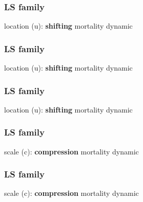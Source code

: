 \documentclass[12pt, xcolor=table]{beamer}  %
\begin{document}
\begin{frame}\frametitle{LS family}
	\begin{center}
		\vspace{0.15cm}
		\normalsize {\color{white}location (u): \textbf{shifting} mortality dynamic} \\
	\end{center}
	
\end{frame}

\begin{frame}[noframenumbering]\frametitle{LS family}
	\begin{center}
		\vspace{0.15cm}
		\normalsize {\color{red}location (u)}: \textbf{shifting} mortality dynamic \\
	\end{center}
	
\end{frame}

\begin{frame}[noframenumbering]\frametitle{LS family}
	\begin{center}
		\vspace{0.15cm}
		\normalsize {\color{red}location (u)}: \textbf{shifting} mortality dynamic \\
	\end{center}
	
\end{frame}

\begin{frame}\frametitle{LS family}
	\begin{center}
		\vspace{0.15cm}
		\normalsize {\color{blue}scale (c)}: \textbf{compression} mortality dynamic \\
	\end{center}
	
\end{frame}

\begin{frame}[noframenumbering]\frametitle{LS family}
	\begin{center}
		\vspace{0.15cm}
		\normalsize {\color{blue}scale (c)}: \textbf{compression} mortality dynamic \\
	\end{center}
	
\end{frame}
\end{document}
